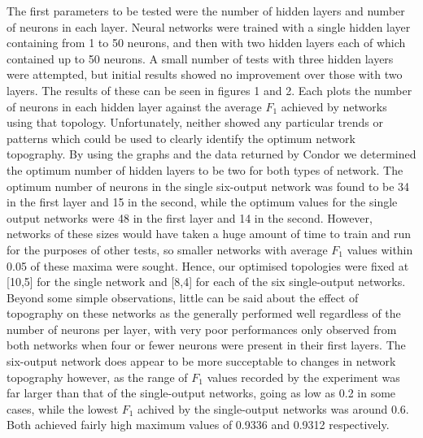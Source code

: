 \documentclass[a4paper]{article}
\begin{document}
The first parameters to be tested were the number of hidden layers and number of neurons in each layer. Neural networks were trained
with a single hidden layer containing from 1 to 50 neurons, and then with two hidden layers each of which contained up to 50 neurons.
A small number of tests with three hidden layers were attempted, but initial results showed no improvement over those with two layers. The
results of these can be seen in figures 1 and 2. Each plots the number of neurons in each hidden layer against the average $F_1$ achieved by
networks using that topology. Unfortunately, neither showed any particular trends or patterns which could be used to clearly identify the
optimum network topography. By using the graphs and the data returned by Condor we determined the optimum number of hidden layers to be
two for both types of network. The optimum number of neurons in the single six-output network was found to be 34 in the first layer and 15 in the
second, while the optimum values for the single output networks were 48 in the first layer and 14 in the second. However, networks of these sizes
would have taken a huge amount of time to train and run for the purposes of other tests, so smaller networks with average $F_1$ values 
within 0.05 of these maxima were sought. Hence, our optimised topologies were fixed at [10,5] for the single network and [8,4] 
for each of the six single-output networks.\\

Beyond some simple observations, little can be said about the effect of topography on these networks as the generally performed well regardless of 
the number of neurons per layer,
with very poor performances only observed from both networks when four or fewer neurons were present in their first layers. The six-output network
does appear to be more succeptable to changes in network topography however, as the range of $F_1$ values recorded by the experiment was far larger
than that of the single-output networks, going as low as 0.2 in some cases, while the lowest $F_1$ achived by the single-output networks was around 0.6.
Both achieved fairly high maximum values of 0.9336 and 0.9312 respectively.\\
\end{document}
